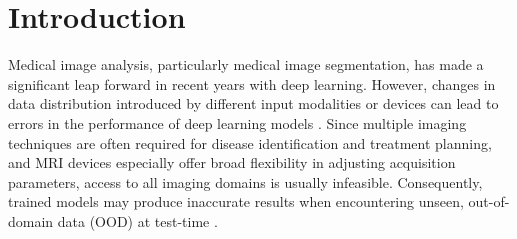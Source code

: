 \section{Introduction}
\label{sec:introduction_dgtta}

    Medical image analysis, particularly medical image segmentation, has made a significant leap forward in recent years with deep learning. However, changes in data distribution introduced by different input modalities or devices can lead to errors in the performance of deep learning models \cite{karani2018lifelong}. Since multiple imaging techniques are often required for disease identification and treatment planning, and MRI devices especially offer broad flexibility in adjusting acquisition parameters, access to all imaging domains is usually infeasible. Consequently, trained models may produce inaccurate results when encountering unseen, out-of-domain data (OOD) at test-time  \cite{pooch2020can}.


